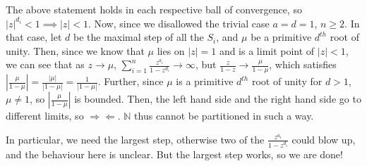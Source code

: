 \documentclass[12pt,letterpaper]{article}
\theoremstyle{definition}
\newcommand{\contra}{\Rightarrow\!\Leftarrow}
\newcommand{\N}{\mathbb{N}}
\begin{document}
The above statement holds in each respective ball of convergence, so $|z|^{d_{i}} < 1 \implies |z| < 1$. Now, since we disallowed the trivial case $a = d =  1$, $n \geq 2$. In that case, let $d$ be the maximal step of all the $S_{i}$, and $\mu$ be a primitive $d^{th}$ root of unity. Then, since we know that $\mu$ lies on $|z| = 1$ and is a limit point of $|z| < 1$, we can see that as $z \rightarrow \mu$, $\sum_{i=1}^{n}\frac{z^{a_{i}}}{1-z^{d_{i}}} \rightarrow \infty$, but $\frac{z}{1-z} \rightarrow \frac{\mu}{1-\mu}$, which satisfies $|\frac{\mu}{1-\mu}| = \frac{|\mu|}{|1-\mu|} = \frac{1}{|1 - \mu|}$. Further, since $\mu$ is a primitive $d^{th}$ root of unity for $d > 1$, $\mu \neq 1$, so $|\frac{\mu}{1-\mu}|$ is bounded. Then, the left hand side and the right hand side go to different limits, so $\contra$. $\N$ thus cannot be partitioned in such a way.

In particular, we need the largest step, otherwise two of the $\frac{z^{a_{i}}}{1-z^{d_{i}}}$ could blow up, and the behaviour here is unclear. But the largest step works, so we are done!
\end{document}
